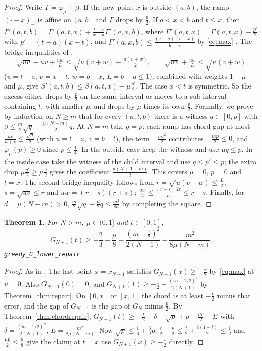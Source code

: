 \documentclass[11pt]{amsart}
\newtheorem{theorem}{Theorem}
\theoremstyle{remark}
\newcommand{\lean}[1]{\texttt{\small #1}}
\begin{document}
\begin{proof}
Write $\Gamma=\varphi_\mu+\beta$. If the new point $x$ is outside $(a,b)$, the ramp
$(\cdot-x)_+$ is affine on $[a,b]$ and $\Gamma$ drops by $\frac p2$. If
$a<x<b$ and $t\le x$, then
$\Gamma'(a,t,b)=\Gamma'(a,t,x)+\frac{t-a}{x-a}\Gamma'(a,x,b)$, where
$\Gamma'(a,t,x)=\Gamma(a,t,x)-\frac{p'}2$ with $p'=(t-a)(x-t)$, and
$\Gamma'(a,x,b)\le\frac{(x-a)(b-x)}{b-a}$ by \eqref{eq:max} \cite{Den}. The bridge
inequalities of \cite{Den},
\[
\sqrt{uv}-uv+\tfrac{uw}L\le\sqrt{u(v+w)}-\tfrac{u(v+w)}2,\qquad
\sqrt{uv}+\tfrac{uw}L\le\sqrt{u(v+w)}
\]
($u=t-a$, $v=x-t$, $w=b-x$, $L=b-a\le1$), combined with weights $1-\mu$ and $\mu$,
give $\beta'(a,t,b)\le\beta(a,t,x)-\mu\frac{p'}2$. The case $x<t$ is
symmetric. So the excess either drops by $\frac p2$ on the same interval or moves
to a sub-interval containing $t$, with smaller $p$, and drops by $\mu$ times its
own $\frac p2$. Formally, we prove by induction on $N\ge m$ that for every
$(a,t,b)$ there is a witness $q\in[0,p]$ with
$\beta\le\frac m2\sqrt q-\frac{\mu(N-m)}2q$. At $N=m$ take $q=p$: each ramp has chord
gap at most $\frac{uv}{u+v}\le\frac{\sqrt p}2$ (with $u=t-a$, $v=b-t$), the term
$-\frac{mt^2}2$ contributes $-\frac{mp}2\le0$, and $\varphi_\mu(p)\ge0$ since
$p\le\frac14$. In the outside case keep the witness and use $\mu q\le p$. In the
inside case take the witness of the child interval and use $q\le p'\le p$; the
extra drop $\mu\frac{p'}2\ge\mu\frac q2$ gives the coefficient $\frac{\mu(N+1-m)}2$.
This covers $\mu=0$, $p=0$ and $t=x$. The second bridge inequality follows from
$r=\sqrt{u(v+w)}\le\frac L2$, $s=\sqrt{uv}\le r$ and $uw=(r-s)(r+s)$:
$\frac{uw}L\le\frac{(r-s)\,2r}{L}\le r-s$. Finally, for $d=\mu(N-m)>0$,
$\frac m2\sqrt q-\frac d2q\le\frac{m^2}{8d}$ by completing the square.
\end{proof}

\begin{theorem}\label{thm:lower}
For $N>m$, $\mu\in(0,1]$ and $t\in[0,1]$,
\[
G_{N+1}(t)\ge-\frac23-\frac\mu8-\frac{(m-\frac12)^2}{2(N+1)}-\frac{m^2}{8\mu(N-m)} .
\]
\lean{greedy\_G\_lower\_repair}
\end{theorem}

\begin{proof}
As in \cite[Corollary 7]{Den}. The last point $x=x_{N+1}$ satisfies
$G_{N+1}(x)\ge-\frac x2$ by \eqref{eq:max} at $u=0$. Also $G_{N+1}(0)=0$, and
$G_{N+1}(1)\ge-\frac12-\frac{(m-1/2)^2}{2(N+1)}$ by Theorem~\ref{thm:repair}.
On $[0,x]$ or $[x,1]$ the chord is at least $-\frac t2$ minus that error, and the
gap of $G_{N+1}$ is the gap of $G_N$ minus $\frac p2$. By
Theorem~\ref{thm:chordrepair},
$G_{N+1}(t)\ge-\frac t2-\delta-\sqrt p+p-\frac{\mu p}2-E$ with
$\delta=\frac{(m-1/2)^2}{2(N+1)}$, $E=\frac{m^2}{8\mu(N-m)}$. Now
$\sqrt p\le\frac16+\frac32p$, $\frac t2+\frac p2\le\frac t2+\frac{t(1-t)}2\le\frac12$ and
$\frac{\mu p}2\le\frac\mu8$ give the claim; at $t=x$ use $G_{N+1}(x)\ge-\frac x2$
directly.
\end{proof}
\end{document}
